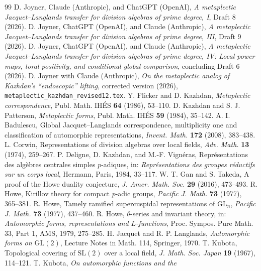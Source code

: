 \documentclass[11pt]{article}
\theoremstyle{plain}
\theoremstyle{definition}
\begin{document}
\begin{thebibliography}{99}
 D. Joyner, Claude (Anthropic), and ChatGPT (OpenAI),
\emph{A metaplectic Jacquet--Langlands transfer for division
algebras of prime degree, I}, Draft 8 (2026).
 D. Joyner, ChatGPT (OpenAI), and Claude (Anthropic),
\emph{A metaplectic Jacquet--Langlands transfer for division
algebras of prime degree, III}, Draft 9 (2026).
 D. Joyner, ChatGPT (OpenAI), and Claude (Anthropic),
\emph{A metaplectic Jacquet--Langlands transfer for division
algebras of prime degree, IV: Local power maps, toral positivity,
and conditional global comparison}, concluding Draft 6 (2026).
 D. Joyner with Claude (Anthropic),
\emph{On the metaplectic analog of Kazhdan's ``endoscopic'' lifting},
corrected version (2026), \texttt{metaplectic\_kazhdan\_revised12.tex}.
 Y. Flicker and D. Kazhdan,
\emph{Metaplectic correspondence}, Publ. Math. IH\'ES
\textbf{64} (1986), 53--110.
 D. Kazhdan and S. J. Patterson, \emph{Metaplectic forms},
Publ. Math. IH\'ES \textbf{59} (1984), 35--142.
 A. I. Badulescu, Global Jacquet--Langlands correspondence,
multiplicity one and classification of automorphic representations,
\emph{Invent. Math.} \textbf{172} (2008), 383--438.
 L. Corwin, Representations of division algebras over local
fields, \emph{Adv. Math.} \textbf{13} (1974), 259--267.
 P. Deligne, D. Kazhdan, and M.-F. Vign\'eras,
Repr\'esentations des alg\`ebres centrales simples $p$-adiques, in:
\emph{Repr\'esentations des groupes r\'eductifs sur un corps local},
Hermann, Paris, 1984, 33--117.
 W. T. Gan and S. Takeda, A proof of the Howe duality
conjecture, \emph{J. Amer. Math. Soc.} \textbf{29} (2016), 473--493.
 R. Howe, Kirillov theory for compact $p$-adic groups,
\emph{Pacific J. Math.} \textbf{73} (1977), 365--381.
 R. Howe, Tamely ramified supercuspidal representations
of $\mathrm{GL}_n$, \emph{Pacific J. Math.} \textbf{73} (1977), 437--460.
 R. Howe, $\theta$-series and invariant theory, in:
\emph{Automorphic forms, representations and $L$-functions}, Proc.
Sympos. Pure Math. 33, Part 1, AMS, 1979, 275--285.
 H. Jacquet and R. P. Langlands, \emph{Automorphic forms on
$\mathrm{GL}(2)$}, Lecture Notes in Math. 114, Springer, 1970.
 T. Kubota, Topological covering of $\mathrm{SL}(2)$ over a
local field, \emph{J. Math. Soc. Japan} \textbf{19} (1967), 114--121.
 T. Kubota, \emph{On automorphic functions and the
}
\end{thebibliography}
\end{document}
